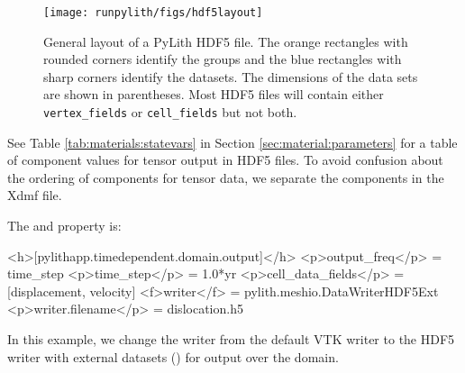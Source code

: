 
\begin{figure}[htbp]
  \texttt{[image: runpylith/figs/hdf5layout]}
  \caption{General layout of a PyLith HDF5 file. The orange rectangles
    with rounded corners identify the groups and the blue rectangles
    with sharp corners identify the datasets. The dimensions of the
    data sets are shown in parentheses. Most HDF5 files will contain
    either \texttt{vertex\_fields} or \texttt{cell\_fields} but not
    both.}
 \label{fig:hdf5:layout}
\end{figure}

See Table \vref{tab:materials:statevars} in Section
\vref{sec:material:parameters} for a table of component values for
tensor output in HDF5 files. To avoid confusion about the ordering of
components for tensor data, we separate the components in the Xdmf
file.

The  and  property is:
\begin{inventory}
\end{inventory}

\begin{cfg}
<h>[pylithapp.timedependent.domain.output]</h>
<p>output_freq</p> = time_step
<p>time_step</p> = 1.0*yr
<p>cell_data_fields</p> = [displacement, velocity]
<f>writer</f> = pylith.meshio.DataWriterHDF5Ext
<p>writer.filename</p> = dislocation.h5
\end{cfg}
In this example, we change the writer from the default VTK writer to
the HDF5 writer with external datasets ()
for output over the domain.

